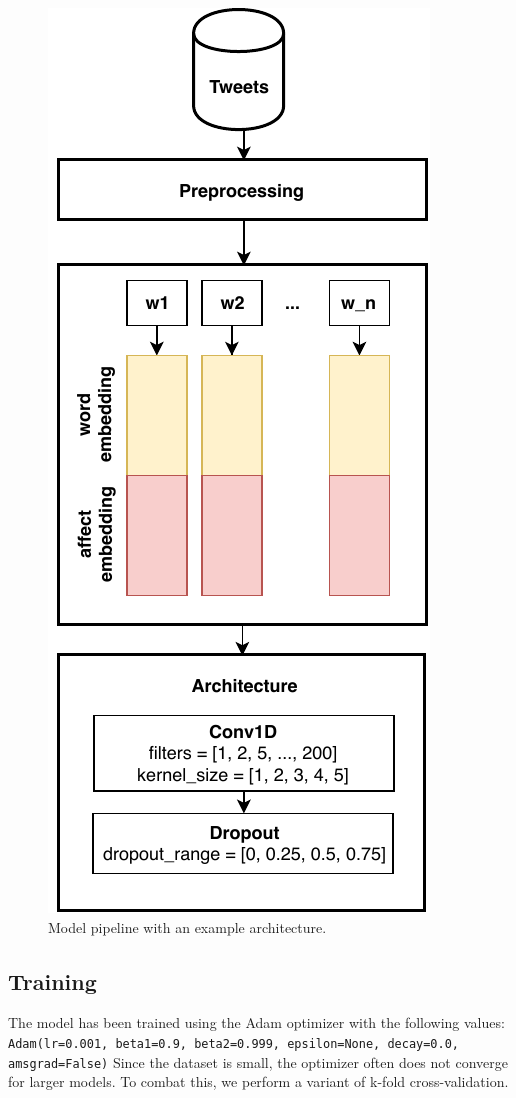 \documentclass[10pt, a4paper]{article}
\begin{document}
\begin{figure}
\begin{center}
\includegraphics[width=0.7\columnwidth]{images/architecture.pdf}
\caption{Model pipeline with an example architecture.}
\label{fig:figure1}
\end{center}
\end{figure}


\subsection{Training}
The model has been trained using the Adam optimizer with the following values:
\texttt{Adam(lr=0.001, beta1=0.9, beta2=0.999, epsilon=None, decay=0.0, amsgrad=False)}
Since the dataset is small, the optimizer often does not converge for larger models.
To combat this, we perform a variant of k-fold cross-validation.
\end{document}
